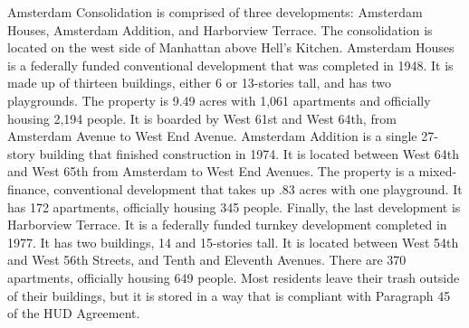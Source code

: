 Amsterdam Consolidation is comprised of three developments: Amsterdam Houses, Amsterdam Addition, and Harborview Terrace. The consolidation is located on the west side of Manhattan above Hell's Kitchen. Amsterdam Houses is a federally funded conventional development that was completed in 1948. It is made up of thirteen buildings, either 6 or 13-stories tall, and has two playgrounds. The property is 9.49 acres with 1,061 apartments and officially housing 2,194 people. It is boarded by West 61st and West 64th, from Amsterdam Avenue to West End Avenue. Amsterdam Addition is a single 27-story building that finished construction in 1974. It is located between West 64th and West 65th from Amsterdam to West End Avenues. The property is a mixed-finance, conventional development that takes up .83 acres with one playground. It has 172 apartments, officially housing 345 people. Finally, the last development is Harborview Terrace. It is a federally funded turnkey development completed in 1977. It has two buildings, 14 and 15-stories tall. It is located between West 54th and West 56th Streets, and Tenth and Eleventh Avenues. There are 370 apartments, officially housing 649 people. Most residents leave their trash outside of their buildings, but it is stored in a way that is compliant with Paragraph 45 of the HUD Agreement.